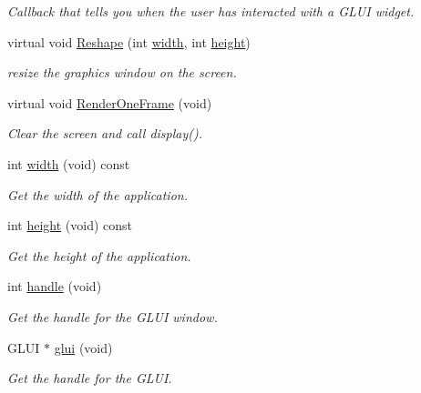 \begin{DoxyCompactItemize}
\begin{DoxyCompactList}\small\item\em Callback that tells you when the user has interacted with a G\+L\+UI widget. \end{DoxyCompactList}\item 
virtual void \hyperlink{classimage__tools_1_1BaseGfxApp_a082984712d240d055abe10d9d9ba5297}{Reshape} (int \hyperlink{classimage__tools_1_1BaseGfxApp_a2fe403c5392f624477c2ce4429f1a7b5}{width}, int \hyperlink{classimage__tools_1_1BaseGfxApp_aa961e13a7a8e6062204223cc33ac7503}{height})
\begin{DoxyCompactList}\small\item\em resize the graphics window on the screen. \end{DoxyCompactList}\item 
virtual void \hyperlink{classimage__tools_1_1BaseGfxApp_ae4dd5d263aa016d5e767a90c4e102e49}{Render\+One\+Frame} (void)
\begin{DoxyCompactList}\small\item\em Clear the screen and call display(). \end{DoxyCompactList}\item 
int \hyperlink{classimage__tools_1_1BaseGfxApp_a2fe403c5392f624477c2ce4429f1a7b5}{width} (void) const 
\begin{DoxyCompactList}\small\item\em Get the width of the application. \end{DoxyCompactList}\item 
int \hyperlink{classimage__tools_1_1BaseGfxApp_aa961e13a7a8e6062204223cc33ac7503}{height} (void) const 
\begin{DoxyCompactList}\small\item\em Get the height of the application. \end{DoxyCompactList}\item 
int \hyperlink{classimage__tools_1_1BaseGfxApp_a18d458232b04b17d522996101ee0945f}{handle} (void)
\begin{DoxyCompactList}\small\item\em Get the handle for the G\+L\+UI window. \end{DoxyCompactList}\item 
G\+L\+UI $\ast$ \hyperlink{classimage__tools_1_1BaseGfxApp_a780a6702441c4d8c821fb40ede140c71}{glui} (void)
\begin{DoxyCompactList}\small\item\em Get the handle for the G\+L\+UI. \end{DoxyCompactList}\end{DoxyCompactItemize}
